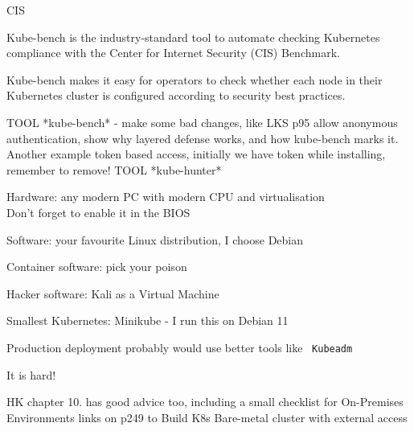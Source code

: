 \documentclass[Screen16to9,17pt]{foils}
\begin{document}

\begin{list2}
\item
\end{list2}

CIS

Kube-bench is the industry-standard tool to automate checking Kubernetes compliance with the Center for Internet Security (CIS) Benchmark.

Kube-bench makes it easy for operators to check whether each node in their Kubernetes cluster is configured according to security best practices.



TOOL *kube-bench* - make some bad changes, like LKS p95 allow anonymous authentication, show why layered defense works, and how kube-bench marks it. Another example token based access, initially we have token while installing, remember to remove!
TOOL *kube-hunter*




\begin{list2}
\item Hardware: any modern PC with modern CPU and virtualisation\\
Don't forget to enable it in the BIOS
\item Software: your favourite Linux distribution, I choose Debian
\item Container software: pick your poison
\item Hacker software: Kali as a Virtual Machine 
\item Smallest Kubernetes: Minikube -  I run this on Debian 11
\item Production deployment probably would use better tools like \faWrench\ \verb+Kubeadm+
\end{list2}





\begin{list2}
\item It is hard!


\item HK chapter 10. has good advice too, including a small checklist for On-Premises Environments
links on p249 to Build K8s Bare-metal cluster with external access\\
\\
\\
\end{list2}
\end{document}
